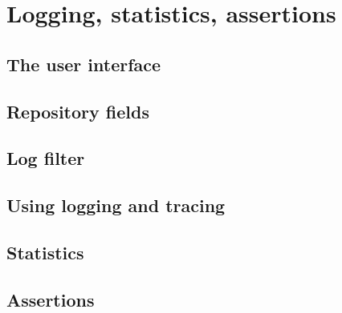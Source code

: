 \chapter{Logging, statistics, assertions}
\label{chapter:logging}

\section{The user interface}

\section{Repository fields}

\section{Log filter}

\section{Using logging and tracing}

\section{Statistics}


\section{Assertions}



